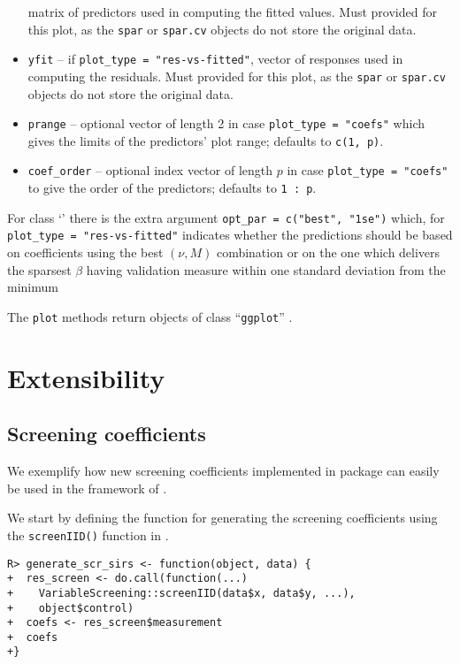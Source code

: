 \documentclass[
  article]{jss}
\newcommand{\class}[1]{`\code{#1}'}
\begin{document}
\begin{itemize}
  matrix of predictors used in computing the fitted values. Must
  provided for this plot, as the \texttt{spar} or \texttt{spar.cv}
  objects do not store the original data.
\item
  \texttt{yfit} -- if \texttt{plot\_type\ =\ "res-vs-fitted"}, vector of
  responses used in computing the residuals. Must provided for this
  plot, as the \texttt{spar} or \texttt{spar.cv} objects do not store
  the original data.
\item
  \texttt{prange} -- optional vector of length 2 in case
  \texttt{plot\_type\ =\ "coefs"} which gives the limits of the
  predictors' plot range; defaults to \texttt{c(1,\ p)}.
\item
  \texttt{coef\_order} -- optional index vector of length \(p\) in case
  \texttt{plot\_type\ =\ "coefs"} to give the order of the predictors;
  defaults to \texttt{1\ :\ p}.
\end{itemize}

For class \class{spar.cv} there is the extra argument
\texttt{opt\_par\ =\ c("best",\ "1se")} which, for
\texttt{plot\_type\ =\ "res-vs-fitted"} indicates whether the
predictions should be based on coefficients using the best \((\nu, M)\)
combination or on the one which delivers the sparsest \(\beta\) having
validation measure within one standard deviation from the minimum

The \texttt{plot} methods return objects of class ``\texttt{ggplot}''
\citep{ggplotR}.

\section{Extensibility}\label{sec-extensibility}

\subsection{Screening coefficients}\label{sec-extensscrcoef}

We exemplify how new screening coefficients implemented in package
 can easily be used in the framework of
.

We start by defining the function for generating the screening
coefficients using the \texttt{screenIID()} function in
.

\begin{verbatim}
R> generate_scr_sirs <- function(object, data) {
+  res_screen <- do.call(function(...) 
+    VariableScreening::screenIID(data$x, data$y, ...), 
+    object$control)
+  coefs <- res_screen$measurement
+  coefs
+}
\end{verbatim}
\end{document}
